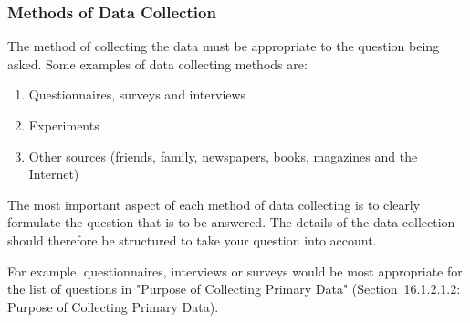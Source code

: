 \begin{description}[noitemsep]
            \subsubsection{ Methods of Data Collection}
            \nopagebreak
        \label{m39403*id200621}The method of collecting the data must be appropriate to the question being asked. Some examples of data collecting methods are:\par 
        \label{m39403*id200626}\begin{enumerate}[noitemsep, label=\textbf{\arabic*}. ] 
            \label{m39403*uid17}\item Questionnaires, surveys and interviews
\label{m39403*uid18}\item Experiments
\label{m39403*uid19}\item Other sources (friends, family, newspapers, books, magazines and the Internet)
\end{enumerate}
        \label{m39403*id200664}The most important aspect of each method of data collecting is to clearly formulate the question that is to be answered. The details of the data collection should therefore be structured to take your question into account.\par 
        \label{m39403*id200670}For example, questionnaires, interviews or surveys would be most appropriate for the list of questions in "Purpose of Collecting Primary Data" (Section~16.1.2.1.2: Purpose of Collecting Primary Data).\par 
      \label{m39403*uid20}

\end{description}
